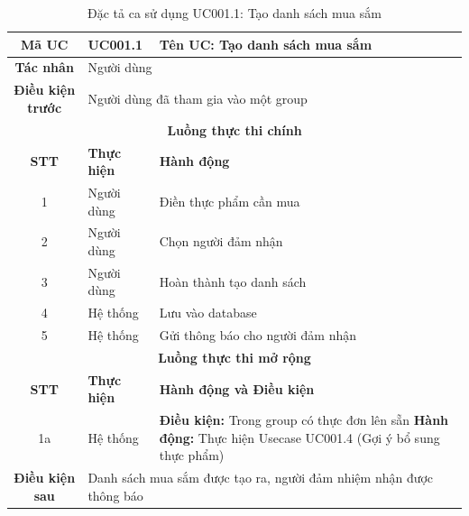 \begin{table}[H]
    \centering
    \label{tab:uc001-1}
    \begin{tabularx}{\textwidth}{|c|p{3.5cm}|X|}
        \hline
        \rowcolor{headergreen} 
        \textbf{Mã UC} & \textbf{UC001.1} & \textbf{Tên UC: Tạo danh sách mua sắm} \\ \hline
        \textbf{Tác nhân} & \multicolumn{2}{l|}{Người dùng} \\ \hline
        \textbf{Điều kiện trước} & \multicolumn{2}{X|}{Người dùng đã tham gia vào một group} \\ \hline
        
        \multicolumn{3}{|c|}{\cellcolor{headerorange}\textbf{Luồng thực thi chính}} \\ \hline
        \rowcolor{graybg} \textbf{STT} & \textbf{Thực hiện} & \textbf{Hành động} \\ \hline
        1 & Người dùng & Điền thực phẩm cần mua \\ \hline
        2 & Người dùng & Chọn người đảm nhận \\ \hline
        3 & Người dùng & Hoàn thành tạo danh sách \\ \hline
        4 & Hệ thống & Lưu vào database \\ \hline
        5 & Hệ thống & Gửi thông báo cho người đảm nhận \\ \hline
        
        \multicolumn{3}{|c|}{\cellcolor{headerorange}\textbf{Luồng thực thi mở rộng}} \\ \hline
        \rowcolor{graybg} \textbf{STT} & \textbf{Thực hiện} & \textbf{Hành động và Điều kiện} \\ \hline
        1a & Hệ thống & \textbf{Điều kiện:} Trong group có thực đơn lên sẵn \newline \textbf{Hành động:} Thực hiện Usecase UC001.4 (Gợi ý bổ sung thực phẩm) \\ \hline
        
        \textbf{Điều kiện sau} & \multicolumn{2}{X|}{Danh sách mua sắm được tạo ra, người đảm nhiệm nhận được thông báo} \\ \hline
    \end{tabularx}
    \caption{Đặc tả ca sử dụng UC001.1: Tạo danh sách mua sắm}
\end{table}

